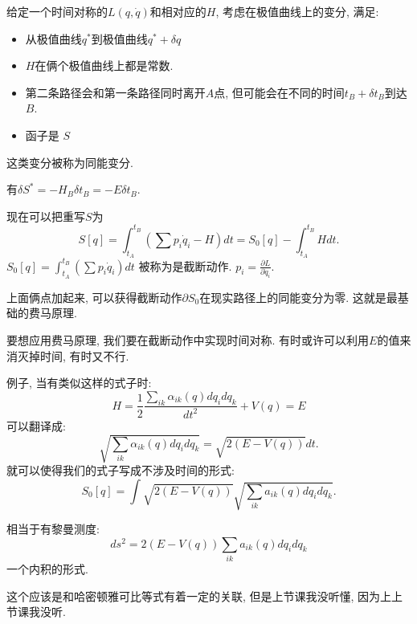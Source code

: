 给定一个时间对称的\(L(q,\dot q)\)和相对应的\(H\), 考虑在极值曲线上的变分, 满足: 
\begin{itemize}
    \item 从极值曲线\(q^*\)到极值曲线\(q^* + \delta q\)
    \item \(H\)在俩个极值曲线上都是常数. 
    \item 第二条路径会和第一条路径同时离开\(A\)点, 但可能会在不同的时间\(t_B + \delta t_B\)到达\(B\).
    \item 函子是 \(S\)
\end{itemize}
这类变分被称为同能变分. 

有\(\delta S^* = -H_B\delta t_B = -E\delta t_B\). 

现在可以把重写\(S\)为
\[S[q] = \int_{t_A}^{t_B}(\sum p_i \dot q_i - H) dt = S_0[q] - \int_{t_A}^{t_B}Hdt.\]
\(S_0[q] = \int_{t_A}^{t_B}(\sum p_i \dot q_i) dt\) 被称为是截断动作. \(p_i= \frac{\partial L}{\partial \dot q_i}\). 

上面俩点加起来, 可以获得截断动作\(\partial S_0\)在现实路径上的同能变分为零. 这就是最基础的费马原理. 

要想应用费马原理, 我们要在截断动作中实现时间对称. 有时或许可以利用\(E\)的值来消灭掉时间, 有时又不行. 

例子, 当有类似这样的式子时:
\[H = \frac{1}{2}\frac{\sum_{ik}\alpha_{ik}(q)dq_idq_k}{dt^2} + V(q) = E\]
可以翻译成: 
\[\sqrt{\sum_{ik}\alpha_{ik}(q) dq_i dq_k} = \sqrt{2(E-V(q))}dt. \]
就可以使得我们的式子写成不涉及时间的形式: 
\[S_0[q] = \int \sqrt{2(E-V(q))} \sqrt{\sum_{ik}a_{ik}(q)dq_idq_k}.\]

相当于有黎曼测度: 
\[ds^2 = 2(E-V(q))\sum_{ik}a_{ik}(q)dq_idq_k\]
一个内积的形式. 

这个应该是和哈密顿雅可比等式有着一定的关联, 但是上节课我没听懂, 因为上上节课我没听. 